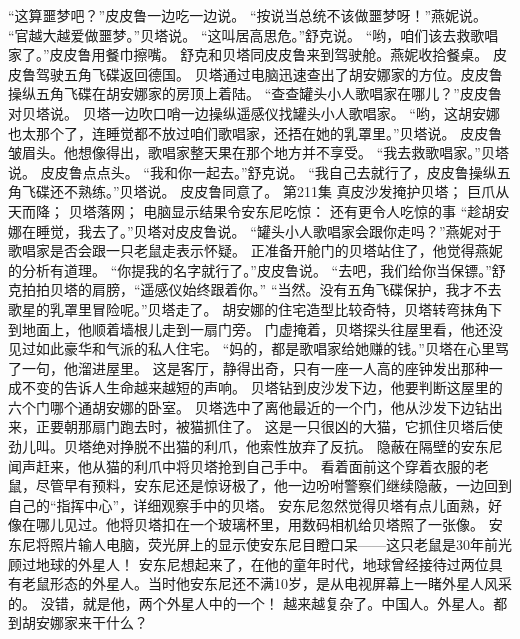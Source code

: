 \documentclass[a4paper,12pt,UTF8,twoside]{ctexbook}
\begin{document}
        “这算噩梦吧？”皮皮鲁一边吃一边说。 
        “按说当总统不该做噩梦呀！”燕妮说。 
        “官越大越爱做噩梦。”贝塔说。 
        “这叫居高思危。”舒克说。 
        “哟，咱们该去救歌唱家了。”皮皮鲁用餐巾擦嘴。 
        舒克和贝塔同皮皮鲁来到驾驶舱。燕妮收拾餐桌。 
        皮皮鲁驾驶五角飞碟返回德国。 
        贝塔通过电脑迅速查出了胡安娜家的方位。皮皮鲁操纵五角飞碟在胡安娜家的房顶上着陆。 
        “查查罐头小人歌唱家在哪儿？”皮皮鲁对贝塔说。 
        贝塔一边吹口哨一边操纵遥感仪找罐头小人歌唱家。 
        “哟，这胡安娜也太那个了，连睡觉都不放过咱们歌唱家，还捂在她的乳罩里。”贝塔说。 
        皮皮鲁皱眉头。他想像得出，歌唱家整天果在那个地方并不享受。 
        “我去救歌唱家。”贝塔说。 
        皮皮鲁点点头。 
        “我和你一起去。”舒克说。 
        “我自己去就行了，皮皮鲁操纵五角飞碟还不熟练。”贝塔说。 
        皮皮鲁同意了。   第211集 
        真皮沙发掩护贝塔； 
        巨爪从天而降； 
        贝塔落网； 
        电脑显示结果令安东尼吃惊： 
        还有更令人吃惊的事   
        “趁胡安娜在睡觉，我去了。”贝塔对皮皮鲁说。 
        “罐头小人歌唱家会跟你走吗？”燕妮对于歌唱家是否会跟一只老鼠走表示怀疑。 
        正准备开舱门的贝塔站住了，他觉得燕妮的分析有道理。 
        “你提我的名字就行了。”皮皮鲁说。 
        “去吧，我们给你当保镖。”舒克拍拍贝塔的肩膀，“遥感仪始终跟着你。” 
        “当然。没有五角飞碟保护，我才不去歌星的乳罩里冒险呢。”贝塔走了。 
        胡安娜的住宅造型比较奇特，贝塔转弯抹角下到地面上，他顺着墙根儿走到一扇门旁。 
        门虚掩着，贝塔探头往屋里看，他还没见过如此豪华和气派的私人住宅。 
        “妈的，都是歌唱家给她赚的钱。”贝塔在心里骂了一句，他溜进屋里。 
        这是客厅，静得出奇，只有一座一人高的座钟发出那种一成不变的告诉人生命越来越短的声响。 
        贝塔钻到皮沙发下边，他要判断这屋里的六个门哪个通胡安娜的卧室。 
        贝塔选中了离他最近的一个门，他从沙发下边钻出来，正要朝那扇门跑去时，被猫抓住了。 
        这是一只很凶的大猫，它抓住贝塔后使劲儿叫。贝塔绝对挣脱不出猫的利爪，他索性放弃了反抗。 
        隐蔽在隔壁的安东尼闻声赶来，他从猫的利爪中将贝塔抢到自己手中。 
        看着面前这个穿着衣服的老鼠，尽管早有预料，安东尼还是惊讶极了，他一边吩咐警察们继续隐蔽，一边回到自己的“指挥中心”，详细观察手中的贝塔。 
        安东尼忽然觉得贝塔有点儿面熟，好像在哪儿见过。他将贝塔扣在一个玻璃杯里，用数码相机给贝塔照了一张像。 
        安东尼将照片输人电脑，荧光屏上的显示使安东尼目瞪口呆——这只老鼠是30年前光顾过地球的外星人！ 
        安东尼想起来了，在他的童年时代，地球曾经接待过两位具有老鼠形态的外星人。当时他安东尼还不满10岁，是从电视屏幕上一睹外星人风采的。 
        没错，就是他，两个外星人中的一个！ 
        越来越复杂了。中国人。外星人。都到胡安娜家来干什么？ 
\end{document}
